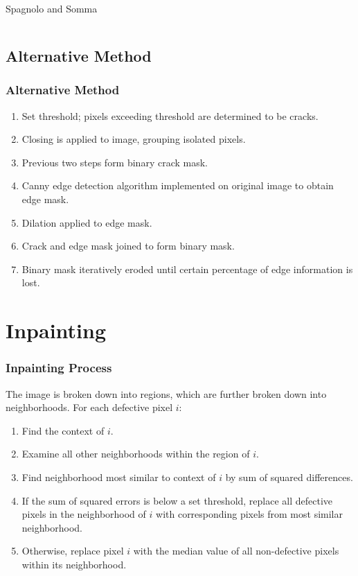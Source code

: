 \documentclass{beamer}
\begin{document}
\begin{frame}
\begin{columns}
\begin{column}{0.5\textwidth}
\begin{center}
\tiny Spagnolo and Somma
\end{center}
\end{column}
\end{columns}
\end{frame}

\subsection[Alternative Method]{Alternative Method}

\begin{frame}
\frametitle{Alternative Method}
\begin{enumerate}
\item Set threshold; pixels exceeding threshold are determined to be cracks.
\item Closing is applied to image, grouping isolated pixels.
\item Previous two steps form binary crack mask.
\item Canny edge detection algorithm implemented on original image to obtain edge mask.
\item Dilation applied to edge mask.
\item Crack and edge mask joined to form binary mask.
\item Binary mask iteratively eroded until certain percentage of edge information is lost.
\end{enumerate}
\end{frame}

\section[Inpainting]{Inpainting}

\begin{frame}
\frametitle{Inpainting Process}
The image is broken down into regions, which are further broken down into neighborhoods. For each defective pixel $i$:
\begin{enumerate}
\item Find the context of $i$.
\item Examine all other neighborhoods within the region of $i$.
\item Find neighborhood most similar to context of $i$ by sum of squared differences.
\item If the sum of squared errors is below a set threshold, replace all defective pixels in the neighborhood of $i$ with corresponding pixels from most similar neighborhood.
\item Otherwise, replace pixel $i$ with the median value of all non-defective pixels within its neighborhood.
\end{enumerate}
\end{frame}
\end{document}

